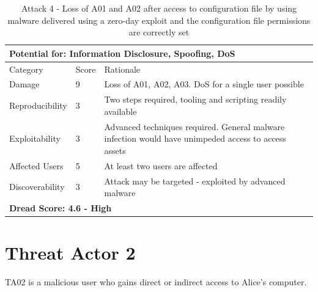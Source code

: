 \documentclass [11pt, proquest] {uwthesis}[2020/02/24]
\begin{document}
\begin{table}[H]
\begin{tabular}{|m{3cm}|m{1cm}|p{27em} |}
\multicolumn{3}{l}{Potential for: Information Disclosure, Spoofing, DoS}                   \\
\hline
Category & Score & Rationale \\
\hline
Damage          & 9     & Loss of A01, A02, A03. DoS for a single user possible            \\
\hline
Reproducibility & 3     & Two steps required, tooling and scripting readily available    \\
\hline
Exploitability & 3      & Advanced techniques required. General malware infection would have unimpeded access to access assets  \\
\hline
Affected Users  & 5     & At least two users are affected                      \\
\hline
Discoverability & 3     & Attack may be targeted - exploited by advanced malware \\
\hline
\multicolumn{3}{l}{\textbf{Dread Score: 4.6 - High}} 
\end{tabular}
\caption{Attack 4 - Loss of A01 and A02 after access to configuration file by using malware delivered using a zero-day exploit and the configuration file permissions are correctly set}
\label{ref:attack4}
\end{table}


\section{Threat Actor 2}
TA02 is a malicious user who gains direct or indirect access to Alice's computer.  
\end{document}
